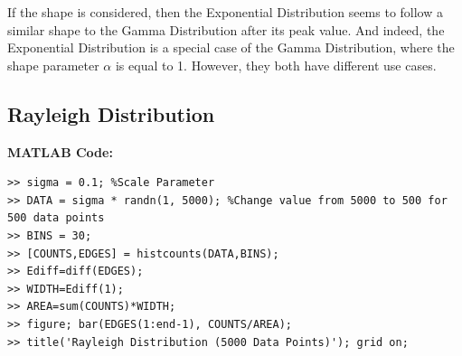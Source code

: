 \documentclass{article}
\theoremstyle{mytheoremstyle}
\theoremstyle{mytheoremstyle}
\theoremstyle{myproblemstyle}
\begin{document}
If the shape is considered, then the Exponential Distribution seems to follow a similar shape to the Gamma Distribution after its peak value. And indeed, the Exponential Distribution is a special case of the Gamma Distribution, where the shape parameter $\alpha$ is equal to 1. However, they both have different use cases.

\newpage
\subsection*{Rayleigh Distribution}

\textbf{MATLAB Code:}
\begin{lstlisting}[caption={Rayleigh Distribution},label={Rayleigh}]
>> sigma = 0.1; %Scale Parameter
>> DATA = sigma * randn(1, 5000); %Change value from 5000 to 500 for 500 data points
>> BINS = 30; 
>> [COUNTS,EDGES] = histcounts(DATA,BINS); 
>> Ediff=diff(EDGES); 
>> WIDTH=Ediff(1); 
>> AREA=sum(COUNTS)*WIDTH;
>> figure; bar(EDGES(1:end-1), COUNTS/AREA); 
>> title('Rayleigh Distribution (5000 Data Points)'); grid on;
\end{lstlisting}
\end{document}
